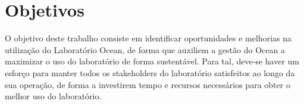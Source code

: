 \section[Objetivos]{Objetivos}
\label{chap:objetivos}

O objetivo deste trabalho consiste em identificar oportunidades e melhorias na utilização do Laboratório Ocean, de forma que auxiliem a gestão do Ocean a maximizar o uso do laboratório de forma sustentável. Para tal, deve-se haver um esforço para manter todos os stakeholders do laboratório satisfeitos ao longo da sua operação, de forma a investirem tempo e recursos necessários para obter o melhor uso do laboratório.
